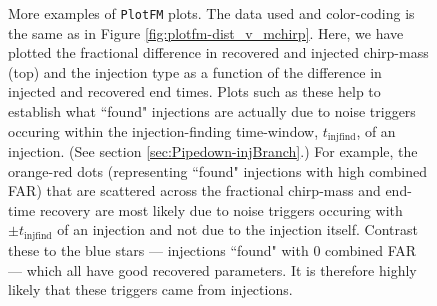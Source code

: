 \begin{figure}[p]
\center
{}
\caption{
More examples of \texttt{PlotFM} plots. The data used and color-coding is the
same as in Figure \ref{fig:plotfm-dist_v_mchirp}. Here, we have plotted the
fractional difference in recovered and injected chirp-mass (top) and the
injection type as a function of the difference in injected and recovered end
times. Plots such as these help to establish what ``found" injections are
actually due to noise triggers occuring within the injection-finding
time-window, $t_{\mathrm{injfind}}$, of an injection. (See section
\ref{sec:Pipedown-injBranch}.) For example, the orange-red dots (representing
``found" injections with high combined FAR) that are scattered across the
fractional chirp-mass and end-time recovery are most likely due to noise
triggers occuring with $\pm t_{\mathrm{injfind}}$ of an injection and not due
to the injection itself. Contrast these to the blue stars --- injections
``found" with 0 combined FAR --- which all have good recovered parameters. It
is therefore highly likely that these triggers came from injections.}
\label{fig:plotfm-example_v_dt}
\end{figure}

